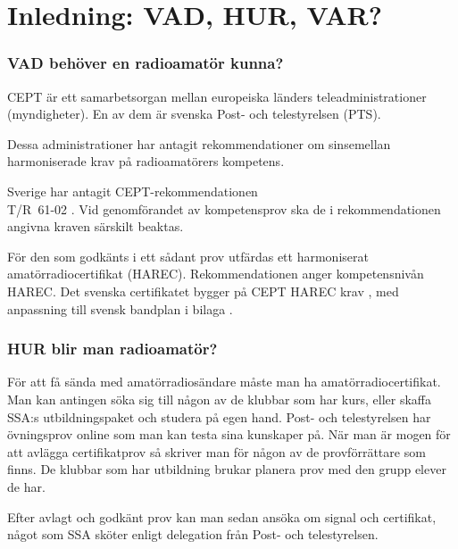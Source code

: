 \chapter*{Inledning: VAD, HUR, VAR?}

\subsection*{VAD behöver en radioamatör kunna?}
\balance

CEPT är ett samarbetsorgan mellan europeiska länders teleadministrationer
(myndigheter). En av dem är svenska Post- och telestyrelsen (PTS).

Dessa administrationer har antagit rekommendationer om sinsemellan
harmoniserade krav på radioamatörers kompetens.

Sverige har antagit CEPT-rekommendationen\\
T/R~61-02 \cite{TR6102}.
Vid genomförandet av kompetensprov ska de i rekommendationen
angivna kraven särskilt beaktas.

För den som godkänts i ett sådant prov utfärdas ett harmoniserat
amatörradiocertifikat (HAREC).
Rekommendationen anger kompetensnivån HAREC.
%
Det svenska certifikatet bygger på CEPT HAREC krav \cite{TR6102},
med anpassning till svensk bandplan i bilaga .

\subsection*{HUR blir man radioamatör?}

För att få sända med amatörradiosändare måste man ha amatörradiocertifikat.
Man kan antingen söka sig till någon av de klubbar som har kurs, eller skaffa
SSA:s utbildningspaket och studera på egen hand.
Post- och telestyrelsen har övningsprov online som man kan testa sina kunskaper
på.
När man är mogen för att avlägga certifikatprov så skriver man för någon av de
provförrättare som finns.
De klubbar som har utbildning brukar planera prov med den grupp elever de har.


Efter avlagt och godkänt prov kan man sedan ansöka om signal och certifikat,
något som SSA sköter enligt delegation från Post- och telestyrelsen.

